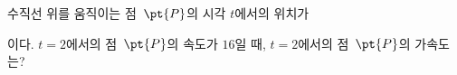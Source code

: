 수직선 위를 움직이는 점~$\pt{P}$의 시각 $t$에서의 위치가\par\smallskip{}\par\smallskip\noindent 이다. $t=2$에서의 점~$\pt{P}$의 속도가 $16$일 때, $t=2$에서의 점~$\pt{P}$의 가속도는? 
